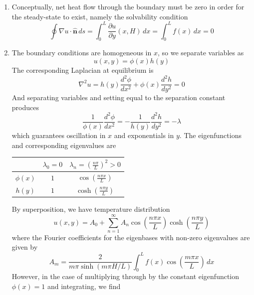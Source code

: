 \documentclass[a4paper]{article}
\begin{document}
\begin{enumerate}[label=(\alph*)]
	\item Conceptually, net heat flow through the boundary must be zero in order for the steady-state to exist, namely the solvability condition
	\[
		\oint \nabla u \cdot \pmb{\hat{n}} \, ds = \int^{L}_{0} \frac{\partial u}{\partial y}\!\left( x,H \right) \, dx = \int^{L}_{0} f \!\left( x \right) \, dx = 0
	\]
	\item The boundary conditions are homogeneous in \( x \), so we separate variables as 
	\[
		u \!\left( x,y \right) = \phi \!\left( x \right)h \!\left( y \right) 
	\]
	The corresponding Laplacian at equilibrium is
	\[
		\nabla^{2}u = h \!\left( y \right)\frac{d^2 \phi}{d x^2} + \phi \!\left( x \right)\frac{d^2 h}{d y^2} = 0
	\]
	And separating variables and setting equal to the separation constant produces
	\[
		\frac{1}{\phi \!\left( x \right)}\frac{d^2 \phi}{d x^2} = -\frac{1}{h \!\left( y \right)}\frac{d^2 h}{d y^2} = -\lambda 
	\]
	which guarantees oscillation in \( x \) and exponentials in \( y \). The eigenfunctions and corresponding eigenvalues are
	\begin{center}
		\renewcommand{\arraystretch}{1.8}
		\setlength{\arraycolsep}{10pt}
		\begin{tabular}{|c||c|c|}
			\hline
			\rule[-1.2em]{0pt}{3em}
			 & \( \lambda_{0} = 0 \) & \( \lambda_{n} = \displaystyle{\!\left( \frac{n \pi}{L} \right)^{2}} > 0 \) \\
			\hline\hline
			\rule[-1.2em]{0pt}{3em}
					\( \phi \!\left( x \right) \) & \( 1 \) & \( \displaystyle{\cos\!\left(\frac{n \pi x}{L}\right)} \) \\
			\hline
			\rule[-1.2em]{0pt}{3em}
					\( h \!\left( y \right) \) & \( 1 \) & \( \displaystyle{\cosh\!\left(\frac{n \pi y}{L}\right)} \) \\
			\hline
		\end{tabular}
	\end{center}
	By superposition, we have temperature distribution
	\[
		u \!\left( x,y \right) = A_{0} + \sum^{\infty}_{n=1} A_{n}\cos\!\left(\frac{n \pi x}{L}\right)\cosh\!\left(\frac{n \pi y}{L}\right) 
	\]
	where the Fourier coefficients for the eigenbases with non-zero eigenvalues are given by
	\[
		A_{m} = \frac{2}{m \pi \sinh\!\left(m \pi H / L\right)}\int^{L}_{0} f \!\left( x \right)\cos\!\left(\frac{m \pi x}{L}\right) \, dx  
	\]
	However, in the case of multiplying through by the constant eigenfunction \( \phi \!\left( x \right) = 1 \) and integrating, we find
	\begin{align*}

\end{align*}
\end{enumerate}
\end{document}
